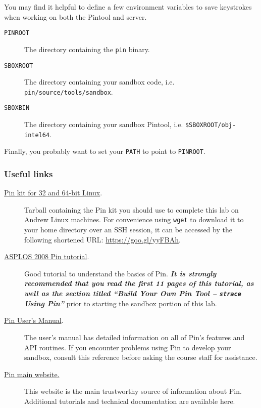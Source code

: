 \documentclass[11pt]{article}
\begin{document}
You may find it helpful to define a few environment variables to save keystrokes when working on both the Pintool and server.
\begin{description}
\item[\texttt{PINROOT}] The directory containing the \verb'pin' binary.
\item[\texttt{SBOXROOT}] The directory containing your sandbox code, i.e. \verb'pin/source/tools/sandbox'.
\item[\texttt{SBOXBIN}] The directory containing your sandbox Pintool, i.e. \verb'$SBOXROOT/obj-intel64'.
\end{description}
Finally, you probably want to set your \verb'PATH' to point to \verb'PINROOT'.

\subsubsection*{Useful links}
\begin{description}
\item[\href{http://software.intel.com/sites/landingpage/pintool/downloads/pin-3.6-97554-g31f0a167d-gcc-linux.tar.gz}{Pin kit for 32 and 64-bit Linux}.] Tarball containing the Pin kit you should use to complete this lab on Andrew Linux machines. For convenience using \verb'wget' to download it to your home directory over an SSH session, it can be accessed by the following shortened URL: \href{https://goo.gl/yyFBAh}{https://goo.gl/yyFBAh}.

\item[\href{https://software.intel.com/sites/default/files/article/256675/asplos2008-handson.pdf}{ASPLOS 2008 Pin tutorial}.] Good tutorial to understand the basics of Pin. \textbf{\emph{It is strongly recommended that you read the first 11 pages of this tutorial, as well as the section titled ``Build Your Own Pin Tool -- \texttt{strace} Using Pin''}} prior to starting the sandbox portion of this lab.

\item[\href{https://software.intel.com/sites/landingpage/pintool/docs/97554/Pin/html/}{Pin User's Manual}.] The user's manual has detailed information on all of Pin's features and API routines. If you encounter problems using Pin to develop your sandbox, consult this reference before asking the course staff for assistance.

\item[\href{https://software.intel.com/en-us/articles/pin-a-dynamic-binary-instrumentation-tool}{Pin main website.}] This website is the main trustworthy source of information about Pin. Additional tutorials and technical documentation are available here.
\end{description}
\end{document}
